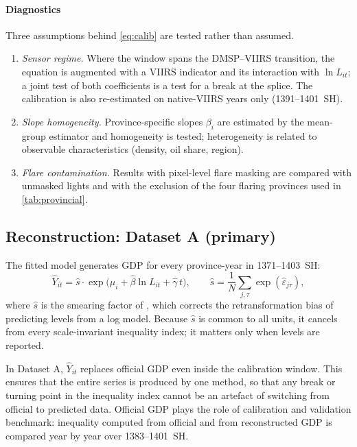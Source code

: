 \documentclass[11pt,a4paper]{article}
\begin{document}
\paragraph{Diagnostics}
Three assumptions behind \eqref{eq:calib} are tested rather than assumed.
\begin{enumerate}[label=(\alph*)]
\item \emph{Sensor regime.} Where the window spans the DMSP--VIIRS transition, the equation is augmented with a VIIRS indicator and its interaction with $\ln L_{it}$; a joint test of both coefficients is a test for a break at the splice. The calibration is also re-estimated on native-VIIRS years only (1391--1401~SH).
\item \emph{Slope homogeneity.} Province-specific slopes $\beta_i$ are estimated by the mean-group estimator \citep{PesaranSmith1995} and homogeneity is tested; heterogeneity is related to observable characteristics (density, oil share, region).
\item \emph{Flare contamination.} Results with pixel-level flare masking are compared with unmasked lights and with the exclusion of the four flaring provinces used in \cref{tab:provincial}.
\end{enumerate}

\subsection{Reconstruction: Dataset A (primary)}\label{sec:datasetA}

The fitted model generates GDP for every province-year in 1371--1403~SH:
\begin{equation}
\widehat{Y}_{it} = \hat s \cdot \exp\!\big(\hat\mu_i + \hat\beta \ln L_{it} + \hat\gamma\, t\big),
\qquad \hat s=\frac{1}{N}\sum_{j,\tau}\exp(\hat\varepsilon_{j\tau}),
\label{eq:predict}
\end{equation}
where $\hat s$ is the smearing factor of \citet{Duan1983}, which corrects the retransformation bias of predicting levels from a log model. Because $\hat s$ is common to all units, it cancels from every scale-invariant inequality index; it matters only when levels are reported.

\begin{keybox}[title={Why reconstruct the whole period, including years with official data?}]
In Dataset A, $\widehat{Y}_{it}$ replaces official GDP even inside the calibration window. This ensures that the entire series is produced by one method, so that any break or turning point in the inequality index cannot be an artefact of switching from official to predicted data. Official GDP plays the role of calibration and validation benchmark: inequality computed from official and from reconstructed GDP is compared year by year over 1383--1401~SH.
\end{keybox}
\end{document}
